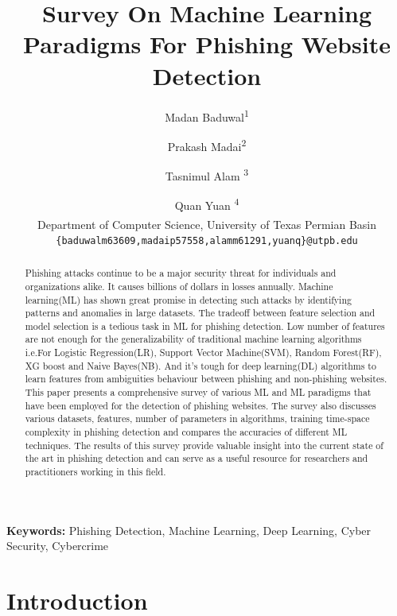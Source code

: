 \documentclass[final]{cvpr}
\begin{document}
\title{Survey On Machine Learning Paradigms For Phishing Website Detection}

\author{Madan Baduwal\textsuperscript{1}  \and Prakash Madai\textsuperscript{2} \and Tasnimul Alam \textsuperscript{3} \and Quan Yuan \textsuperscript{4} \\
\textsuperscript{\rmfamily\textbf{}}Department of Computer Science, University of Texas Permian Basin\\
\texttt{\{baduwal\textunderscore m63609,madai\textunderscore p57558,alam\textunderscore m61291,yuan\textunderscore q\}@utpb.edu}}


\maketitle


\begin{abstract}
   Phishing attacks continue to be a major security threat for individuals and organizations alike. It causes billions of dollars in losses annually. Machine learning(ML) has shown great promise in detecting such attacks by identifying patterns and anomalies in large datasets. The tradeoff between feature selection and model selection is a tedious task in ML for phishing detection. Low number of features are not enough for the generalizability of traditional machine learning algorithms i.e.For Logistic Regression(LR), Support Vector Machine(SVM), Random Forest(RF), XG boost and Naive Bayes(NB). And it's tough for deep learning(DL) algorithms to learn features from ambiguities behaviour between phishing and non-phishing websites. This paper presents a comprehensive survey of various ML and ML paradigms that have been employed for the detection of phishing websites. The survey also discusses various datasets, features, number of parameters in algorithms, training time-space complexity in phishing detection and compares the accuracies of different ML techniques. The results of this survey provide valuable insight into the current state of the art in phishing detection and can serve as a useful resource for researchers and practitioners working in this field.

\end{abstract}

\textbf{Keywords:} Phishing Detection, Machine Learning, Deep Learning, Cyber Security, Cybercrime

\section{Introduction}
\end{document}
